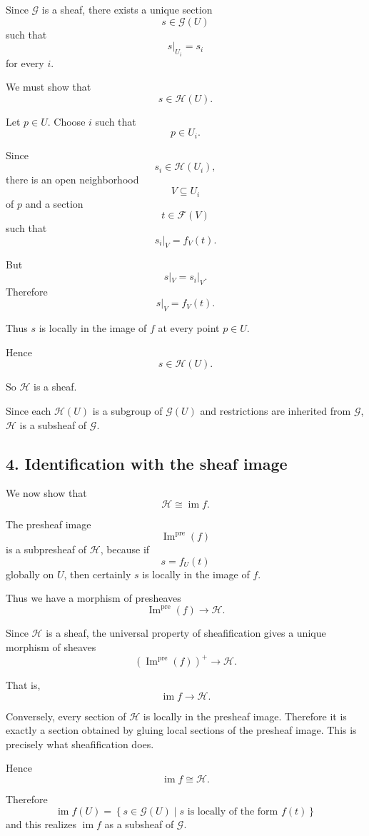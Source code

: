 Since $\mathcal G$ is a sheaf, there exists a unique section
\[
s \in \mathcal G(U)
\]
such that
\[
s|_{U_i}=s_i
\]
for every $i$.

We must show that
\[
s \in \mathcal H(U).
\]

Let $p \in U$.
Choose $i$ such that
\[
p \in U_i.
\]

Since
\[
s_i \in \mathcal H(U_i),
\]
there is an open neighborhood
\[
V \subseteq U_i
\]
of $p$ and a section
\[
t \in \mathcal F(V)
\]
such that
\[
s_i|_V = f_V(t).
\]

But
\[
s|_V = s_i|_V.
\]
Therefore
\[
s|_V = f_V(t).
\]

Thus $s$ is locally in the image of $f$ at every point $p \in U$.

Hence
\[
s \in \mathcal H(U).
\]

So $\mathcal H$ is a sheaf.

Since each $\mathcal H(U)$ is a subgroup of $\mathcal G(U)$ and restrictions
are inherited from $\mathcal G$, $\mathcal H$ is a subsheaf of $\mathcal G$.

\subsection*{4. Identification with the sheaf image}

We now show that
\[
\mathcal H \cong \operatorname{im} f.
\]

The presheaf image
\[
\operatorname{Im}^{\operatorname{pre}}(f)
\]
is a subpresheaf of $\mathcal H$, because if
\[
s = f_U(t)
\]
globally on $U$, then certainly $s$ is locally in the image of $f$.

Thus we have a morphism of presheaves
\[
\operatorname{Im}^{\operatorname{pre}}(f)
\longrightarrow
\mathcal H.
\]

Since $\mathcal H$ is a sheaf, the universal property of sheafification gives
a unique morphism of sheaves
\[
\left(\operatorname{Im}^{\operatorname{pre}}(f)\right)^+
\longrightarrow
\mathcal H.
\]

That is,
\[
\operatorname{im} f \longrightarrow \mathcal H.
\]

Conversely, every section of $\mathcal H$ is locally in the presheaf image.
Therefore it is exactly a section obtained by gluing local sections of the
presheaf image. This is precisely what sheafification does.

Hence
\[
\operatorname{im} f \cong \mathcal H.
\]

Therefore
\[
\boxed{
	\operatorname{im} f(U)
	=
	\left\{
	s \in \mathcal G(U)
	\mid
	s \text{ is locally of the form } f(t)
	\right\}
}
\]
and this realizes $\operatorname{im} f$ as a subsheaf of $\mathcal G$.

